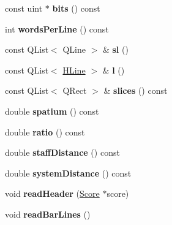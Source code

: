 \begin{DoxyCompactItemize}
const uint $\ast$ {\bfseries bits} () const
\item 
\mbox{\label{class_ms_1_1_omr_page_a26ea86655c30e3de7f4f0afd37fdb8c6}} 
int {\bfseries words\+Per\+Line} () const
\item 
\mbox{\label{class_ms_1_1_omr_page_a77d38ff2c2dabbd325dc107b5ad3f75c}} 
const Q\+List$<$ Q\+Line $>$ \& {\bfseries sl} ()
\item 
\mbox{\label{class_ms_1_1_omr_page_a0c525a4959c481e03e9ec91cbb4fa408}} 
const Q\+List$<$ \hyperlink{struct_ms_1_1_h_line}{H\+Line} $>$ \& {\bfseries l} ()
\item 
\mbox{\label{class_ms_1_1_omr_page_a446415a0faf7b5d0f06dd8e848b53516}} 
const Q\+List$<$ Q\+Rect $>$ \& {\bfseries slices} () const
\item 
\mbox{\label{class_ms_1_1_omr_page_a535f2396efecc102dcb0a492c10289f1}} 
double {\bfseries spatium} () const
\item 
\mbox{\label{class_ms_1_1_omr_page_ad51cb8d950d78dbb8d820d8059e277a4}} 
double {\bfseries ratio} () const
\item 
\mbox{\label{class_ms_1_1_omr_page_a706d766b8d4e2f98bc197ed16b5c47fb}} 
double {\bfseries staff\+Distance} () const
\item 
\mbox{\label{class_ms_1_1_omr_page_ac2669585c519ac66bc43b57dd902a8b0}} 
double {\bfseries system\+Distance} () const
\item 
\mbox{\label{class_ms_1_1_omr_page_a5a2bd5f6153914ce8c3934096c65d9cf}} 
void {\bfseries read\+Header} (\hyperlink{class_ms_1_1_score}{Score} $\ast$score)
\item 
\mbox{\label{class_ms_1_1_omr_page_ac3e106715dadbda96ec83f256ce6f231}} 
void {\bfseries read\+Bar\+Lines} ()
\item 
\mbox{\label{class_ms_1_1_omr_page_aed355dddef66f14bca3b055450e46fdd}} 

\end{DoxyCompactItemize}
